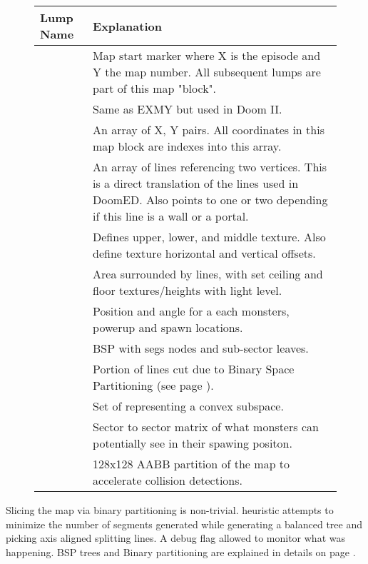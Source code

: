 \par
 \begin{figure}[H]
\centering  
\begin{tabularx}{\textwidth}{ L{0.15} L{0.75} }
  \toprule
  \textbf{Lump Name} &  \textbf{Explanation} \\
  \toprule 
   
    & Map start marker where X is the episode and Y the map number. All subsequent lumps are part of this map "block".\\
    & Same as EXMY but used in Doom II.\\
    & An array of  X, Y pairs. All coordinates in this map block are indexes into this array.\\
    & An array of lines referencing two vertices. This is a direct translation of the lines used in DoomED. Also points to one or two  depending if this line is a wall or a portal. \\
    & Defines upper, lower, and middle texture. Also define texture horizontal and vertical offsets.\\
    & Area surrounded by lines, with set ceiling and floor textures/heights with light level.\\
    & Position and angle for a each monsters, powerup and spawn locations.\\
   \toprule
    & BSP with segs nodes and sub-sector leaves.\\
    & Portion of lines cut due to Binary Space Partitioning (see page \pageref{Binary Space Partitioning: Theory}).\\
    & Set of  representing a convex subspace.\\
   \toprule
    & Sector to sector matrix of what monsters can potentially see in their spawing positon.\\
   \toprule
    & 128x128 AABB partition of the map  to accelerate collision detections.\\
   \toprule
\end{tabularx}
\end{figure}
\par
{}

Slicing the map via binary partitioning is non-trivial.  heuristic attempts to minimize the number of segments generated while generating a balanced tree and picking axis aligned splitting lines. A debug flag  allowed to monitor what was happening. BSP trees and Binary partitioning are explained in details on page \pageref{Binary Space Partitioning: Theory}. \\
\par
{}
\par
